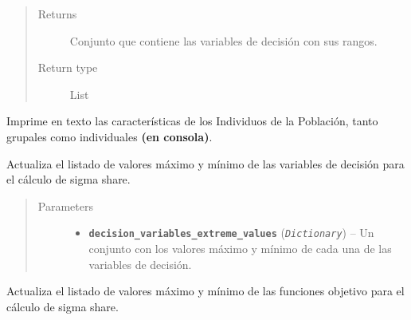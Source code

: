 \documentclass[class=report, crop=false]{standalone}
\begin{document}
\begin{fulllineitems}
\begin{fulllineitems}
\begin{quote}\begin{description}
\item[{Returns}] \leavevmode
Conjunto que contiene las variables de decisión con sus rangos.
\item[{Return type}] \leavevmode
List
\end{description}\end{quote}

\end{fulllineitems}

\begin{fulllineitems}

Imprime en texto las características de los Individuos
de la Población, tanto grupales como individuales 
\textbf{(en consola)}.

\end{fulllineitems}

\begin{fulllineitems}

Actualiza el listado de valores máximo y mínimo de las
variables de decisión para el cálculo de sigma share.

\begin{quote}\begin{description}
\item[{Parameters}] \leavevmode\begin{itemize}
\item \textbf{\texttt{decision\_variables\_extreme\_values}} (\emph{\texttt{Dictionary}}) -- Un conjunto con los valores máximo y mínimo
de cada una de las variables de decisión.
\end{itemize}
\end{description}\end{quote}

\end{fulllineitems}

\begin{fulllineitems}

Actualiza el listado de valores máximo y mínimo de las
funciones objetivo para el cálculo de sigma share.


\end{fulllineitems}
\end{fulllineitems}
\end{document}
